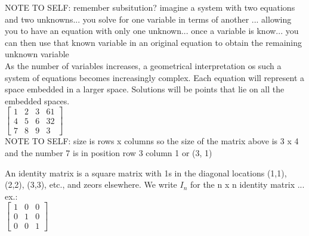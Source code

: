 \documentclass{article}
\begin{document}
	NOTE TO SELF: remember subsitution? imagine a system with two equations and two unknowns... you solve for one variable in terms of another ... allowing you to have an equation with only one unknown... once a variable is know... you can then use that known variable in an original equation to obtain the remaining unknown variable\\

	As the number of variables increases, a geometrical interpretation os such a system of equations becomes increasingly complex. Each equation will represent a space embedded in a larger space. Solutions will be points that lie on all the embedded spaces.\\

$
\begin{bmatrix}
	1 & 2 & 3 & 61\\
	4 & 5 & 6 & 32\\
	7 & 8 & 9 & 3
\end{bmatrix}
$\\

NOTE TO SELF: size is rows x columns so the size of the matrix above is 3 x 4 and the number 7 is in position row 3 column 1 or (3, 1)

An identity matrix is a square matrix with 1s in the diagonal locations (1,1), (2,2), (3,3), etc., and zeors elsewhere. We write $I_n$ for the n x n identity matrix ... ex.:\\

$
\begin{bmatrix}
	1 & 0 & 0\\
	0 & 1 & 0\\
	0 & 0 & 1
\end{bmatrix}
$\\
\end{document}
